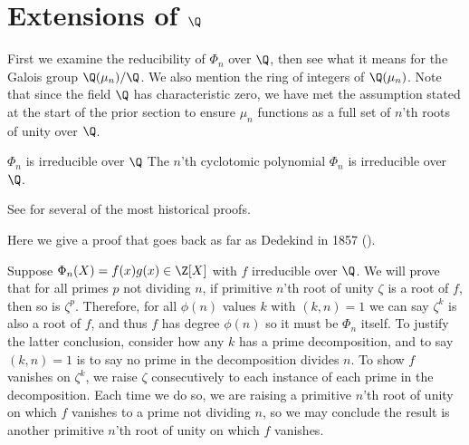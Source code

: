 \section[Extensions of Q]{Extensions of $\Q$}

First we examine the reducibility of $\Phi_n$ over $\Q$, then see what it means for the Galois group $\Q(\mu_n)/\Q$.
We also mention the ring of integers of $\Q(\mu_n)$.
Note that since the field $\Q$ has characteristic zero, we have met the assumption stated at the start of the prior section to ensure $\mu_n$ functions as a full set of $n$'th roots of unity over $\Q$.

\begin{theorem}{$\Phi_n$ is irreducible over $\Q$}
    The $n$'th cyclotomic polynomial $\Phi_n$ is irreducible over $\Q$.

    \proof
    See \cite{Weintraub} for several of the most historical proofs.

    \proof
    Here we give a proof that goes back as far as Dedekind in 1857 (\cite{Mil21}).

    Suppose $\Phi_n(X)=f(x)g(x)\in\Z[X]$ with $f$ irreducible over $\Q$.
    We will prove that for all primes $p$ not dividing $n$, if primitive $n$'th root of unity $\zeta$ is a root of $f$, then so is $\zeta^p$.
    Therefore, for all $\phi(n)$ values $k$ with $(k,n)=1$ we can say $\zeta^k$ is also a root of $f$, and thus $f$ has degree $\phi(n)$ so it must be $\Phi_n$ itself.
    To justify the latter conclusion, consider how any $k$ has a prime decomposition, and to say $(k,n)=1$ is to say no prime in the decomposition divides $n$.
    To show $f$ vanishes on $\zeta^k$, we raise $\zeta$ consecutively to each instance of each prime in the decomposition.
    Each time we do so, we are raising a primitive $n$'th root of unity on which $f$ vanishes to a prime not dividing $n$, so we may conclude the result is another primitive $n$'th root of unity on which $f$ vanishes.


\end{theorem}
